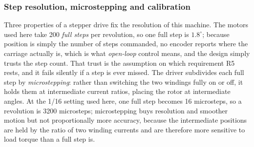 \subsubsection{Step resolution, microstepping and calibration}
\label{sec:gan-res}
\label{sec:gan-timing}

Three properties of a stepper drive fix the resolution of this machine. The motors used here take 200 \emph{full steps} per revolution, so one full step is $1.8^\circ$; because position is simply the number of steps commanded, no encoder reports where the carriage actually is, which is what \emph{open-loop} control means, and the design simply trusts the step count. That trust is the assumption on which requirement R5 rests, and it fails silently if a step is ever missed. The driver subdivides each full step by \emph{microstepping}: rather than switching the two windings fully on or off, it holds them at intermediate current ratios, placing the rotor at intermediate angles. At the 1/16 setting used here, one full step becomes 16 microsteps, so a revolution is 3200 microsteps; microstepping buys resolution and smoother motion but not proportionally more accuracy, because the intermediate positions are held by the ratio of two winding currents and are therefore more sensitive to load torque than a full step is.

